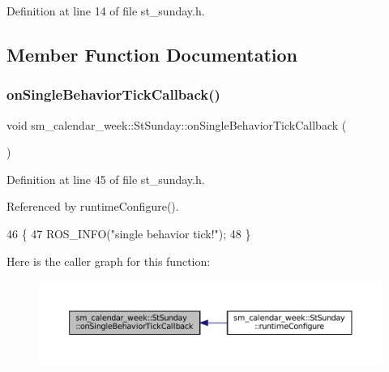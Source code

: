 Definition at line 14 of file st\+\_\+sunday.\+h.



\subsection{Member Function Documentation}
\mbox{\label{structsm__calendar__week_1_1StSunday_a5fd7a600527ff7246a90fffede448544}} 
\subsubsection{\texorpdfstring{on\+Single\+Behavior\+Tick\+Callback()}{onSingleBehaviorTickCallback()}}
{\footnotesize\ttfamily void sm\+\_\+calendar\+\_\+week\+::\+St\+Sunday\+::on\+Single\+Behavior\+Tick\+Callback (\begin{DoxyParamCaption}{ }\end{DoxyParamCaption})\hspace{0.3cm}{\ttfamily [inline]}}



Definition at line 45 of file st\+\_\+sunday.\+h.



Referenced by runtime\+Configure().


\begin{DoxyCode}
46     \{
47         ROS\_INFO(\textcolor{stringliteral}{"single behavior tick!"});
48     \}
\end{DoxyCode}
Here is the caller graph for this function\+:
\nopagebreak
\begin{figure}[H]
\begin{center}
\leavevmode
\includegraphics[width=350pt]{structsm__calendar__week_1_1StSunday_a5fd7a600527ff7246a90fffede448544_icgraph}
\end{center}
\end{figure}
\mbox{\label{structsm__calendar__week_1_1StSunday_a6bba2c59172fea49fc346a658b592557}} 
